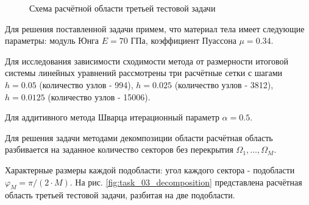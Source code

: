 \documentclass[a4paper]{article}
\begin{document}
\begin{figure}[h]
\caption{Схема расчётной области третьей тестовой задачи}
\label{fig:task_03_scheme}
\end{figure}

Для решения поставленной задачи примем, что материал тела имеет следующие параметры: модуль Юнга $E = 70$ ГПа, коэффициент Пуассона $\mu = 0.34$. 

Для исследования зависимости сходимости метода от размерности итоговой системы линейных уравнений рассмотрены три расчётные сетки с шагами $h = 0.05$ (количество узлов - 994), $h = 0.025$ (количество узлов - 3812), $h = 0.0125$ (количество узлов - 15006).

Для аддитивного метода Шварца итерационный параметр $\alpha = 0.5$.

\newpage

Для решения задачи методами декомпозиции области расчётная область разбивается на заданное количество секторов без перекрытия $\Omega_1, \ldots, \Omega_M$. 

Характерные размеры каждой подобласти: угол каждого сектора - подобласти $\varphi_M = \pi / (2 \cdot M)$. На рис. \ref{fig:task_03_decomposition} представлена расчётная область третьей тестовой задачи, разбитая на две подобласти.
\end{document}

